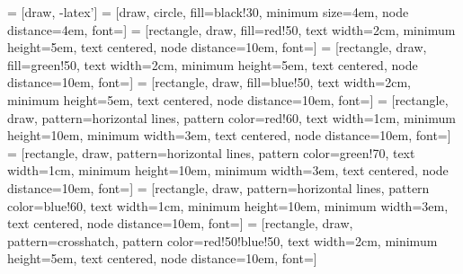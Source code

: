  = [draw, -latex']
 = [draw, circle, fill=black!30, minimum size=4em, node distance=4em, font=\fontsize{30}{10}\selectfont]
 = [rectangle, draw, fill=red!50, text width=2cm, minimum height=5em, text centered, node distance=10em, font=\fontsize{20}{10}\selectfont]
 = [rectangle, draw, fill=green!50, text width=2cm, minimum height=5em, text centered, node distance=10em, font=\fontsize{20}{10}\selectfont]
 = [rectangle, draw, fill=blue!50, text width=2cm, minimum height=5em, text centered, node distance=10em, font=\fontsize{20}{10}\selectfont]
 = [rectangle, draw,  pattern=horizontal lines, pattern color=red!60, text width=1cm, minimum height=10em, minimum width=3em, text centered, node distance=10em, font=\fontsize{25}{10}\selectfont]
 = [rectangle, draw,  pattern=horizontal lines, pattern color=green!70, text width=1cm, minimum height=10em, minimum width=3em, text centered, node distance=10em, font=\fontsize{20}{10}\selectfont]
 = [rectangle, draw,  pattern=horizontal lines, pattern color=blue!60, text width=1cm, minimum height=10em, minimum width=3em, text centered, node distance=10em, font=\fontsize{20}{10}\selectfont]
 = [rectangle, draw,  pattern=crosshatch, pattern color=red!50!blue!50, text width=2cm, minimum height=5em, text centered, node distance=10em, font=\fontsize{20}{10}\selectfont]